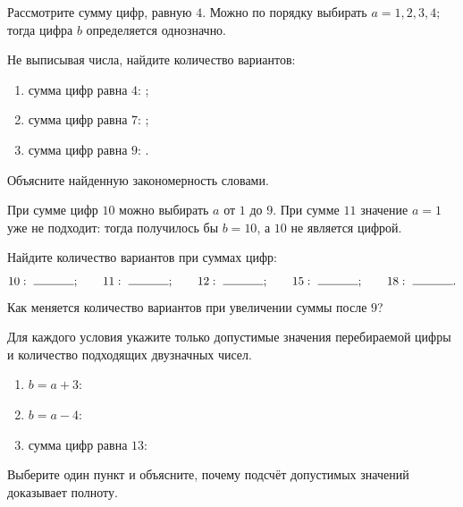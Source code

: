 \newpage
\begin{practicebox}
  Рассмотрите сумму цифр, равную \(4\). Можно по порядку выбирать
  \(a=1,2,3,4\); тогда цифра \(b\) определяется однозначно.

  Не выписывая числа, найдите количество вариантов:
  \begin{enumerate}[label=\textbf{\arabic*.}]
    \item сумма цифр равна \(4\): \answerblank[15mm];
    \item сумма цифр равна \(7\): \answerblank[15mm];
    \item сумма цифр равна \(9\): \answerblank[15mm].
  \end{enumerate}
  Объясните найденную закономерность словами. 
\end{practicebox}

\begin{warningbox}
  При сумме цифр \(10\) можно выбирать \(a\) от \(1\) до \(9\). При сумме
  \(11\) значение \(a=1\) уже не подходит: тогда получилось бы \(b=10\),
  а \(10\) не является цифрой.

  Найдите количество вариантов при суммах цифр:
  \[
    10:\ \answerblank[12mm];\qquad
    11:\ \answerblank[12mm];\qquad
    12:\ \answerblank[12mm];\qquad
    15:\ \answerblank[12mm];\qquad
    18:\ \answerblank[12mm].
  \]
  Как меняется количество вариантов при увеличении суммы после \(9\)?
\end{warningbox}

\begin{checkpointbox}
  Для каждого условия укажите только допустимые значения перебираемой цифры
  и количество подходящих двузначных чисел.
  \begin{enumerate}[label=\textbf{\arabic*.}]
    \item \(b=a+3\): 
    \item \(b=a-4\): 
    \item сумма цифр равна \(13\): 
  \end{enumerate}
  Выберите один пункт и объясните, почему подсчёт допустимых значений доказывает
  полноту. 
\end{checkpointbox}
